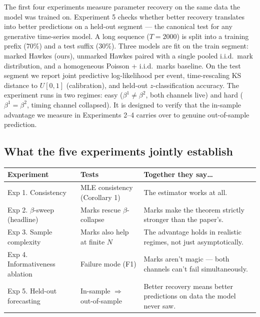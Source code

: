 \documentclass[11pt]{article}
\begin{document}
The first four experiments measure parameter recovery on the same data the model was trained on. Experiment 5 checks whether better recovery translates into better predictions on a held-out segment --- the canonical test for any generative time-series model. A long sequence ($T = 2000$) is split into a training prefix ($70\%$) and a test suffix ($30\%$). Three models are fit on the train segment: marked Hawkes (ours), unmarked Hawkes paired with a single pooled i.i.d.\ mark distribution, and a homogeneous Poisson + i.i.d.\ marks baseline. On the test segment we report joint predictive log-likelihood per event, time-rescaling KS distance to $U[0,1]$ (calibration), and held-out $z$-classification accuracy. The experiment runs in two regimes: easy ($\beta^1 \neq \beta^2$, both channels live) and hard ($\beta^1 = \beta^2$, timing channel collapsed). It is designed to verify that the in-sample advantage we measure in Experiments 2--4 carries over to genuine out-of-sample prediction.

\subsection{What the five experiments jointly establish}

\begin{center}
\begin{tabular}{@{}p{3.3cm}p{4.5cm}p{6cm}@{}}
\toprule
Experiment & Tests & Together they say\dots \\
\midrule
Exp 1. Consistency               & MLE consistency (Corollary 1)          & The estimator works at all. \\
Exp 2. $\beta$-sweep (headline) & Marks rescue $\beta$-collapse             & Marks make the theorem strictly stronger than the paper's. \\
Exp 3. Sample complexity         & Marks also help at finite $N$         & The advantage holds in realistic regimes, not just asymptotically. \\
Exp 4. Informativeness ablation  & Failure mode (F1)                      & Marks aren't magic — both channels can't fail simultaneously. \\
Exp 5. Held-out forecasting      & In-sample $\Rightarrow$ out-of-sample  & Better recovery means better predictions on data the model never saw. \\
\bottomrule
\end{tabular}
\end{center}

\end{document}
